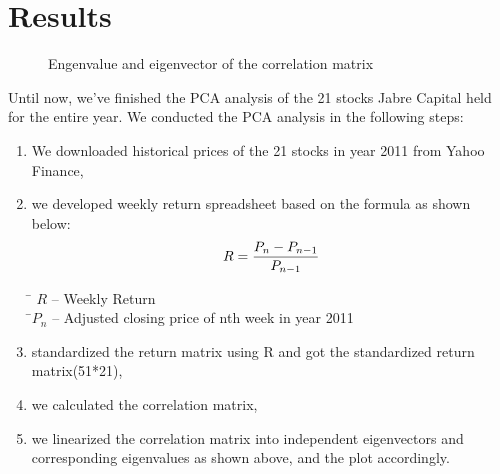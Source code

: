 \documentclass[oneside,12pt]{report}
\begin{document}
\chapter{Results}\label{Results}
\begin{figure}[ht]
\centering
{}
\caption[Optional caption for list of figures]{Engenvalue and eigenvector of the correlation matrix}
\label{fig:subfigureExample}
\end{figure}
Until now, we've finished the PCA analysis of the 21 stocks Jabre Capital held for the entire year. We conducted the PCA analysis in the following steps:
\begin{enumerate}
\item We downloaded historical prices of the 21 stocks in year 2011 from Yahoo Finance, 
\item we developed weekly return spreadsheet based on the formula as shown below:
\begin{equation}
R =\frac{P_n-P_{n-1}}{P_{n-1}}\\
\end{equation}
\begin{tabbing}
\quad \= $R$ -- Weekly Return\\
\quad \=$P_n$  -- Adjusted closing price of nth week in year 2011\\
\end{tabbing}
\item standardized the return matrix using R and got the standardized return matrix(51*21),
\item we calculated the correlation matrix,
\item we linearized the correlation matrix into independent eigenvectors and corresponding eigenvalues as shown above, and the plot accordingly.
\end{enumerate}
\end{document}
